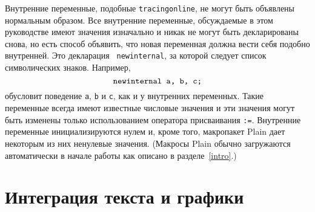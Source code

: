 \documentclass{article} %
\begin{document}
Внутренние переменные, 
подобные {\tt tracingonline}, не могут быть объявлены нормальным образом.
Все внутренние переменные, обсуждаемые в этом руководстве имеют значения 
изначально и никак не могут быть декларированы снова, но есть способ 
объявить, что новая переменная должна вести себя подобно внутренней.
Это декларация {\tt
newinternal}\label{Dnewint}, 
за которой следует список символических знаков.
Например,
$$ \hbox{\tt newinternal a, b, c;} $$
обусловит поведение {\tt a}, {\tt b} и {\tt c}, как и у внутренних переменных.
Такие переменные всегда имеют известные числовые значения и эти значения 
могут быть изменены только использованием оператора 
присваивания {\tt:=}. 
Внутренние переменные инициализируются нулем и, кроме того, макропакет 
Plain дает некоторым из них ненулевые значения. 
(Макросы Plain обычно загружаются автоматически в начале работы как 
описано в разделе~\ref{intro}.)

\section{Интеграция текста и графики}
\label{text}
\end{document}
